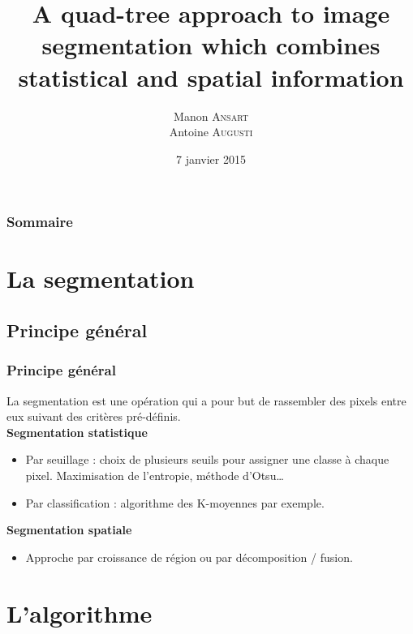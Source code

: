 \documentclass[handout]{beamer}
\title{
	A quad-tree approach to image segmentation which combines statistical and spatial information
}
\author{
	Manon \textsc{Ansart} \\
	\vspace{5px}
	Antoine \textsc{Augusti}
}
\date{7 janvier 2015}
\begin{document}
	\begin{frame}[plain]
		\titlepage
	\end{frame}

	\begin{frame}[plain]
		\frametitle{Sommaire}
		\tableofcontents
	\end{frame}


	\section{La segmentation}

		\subsection{Principe général}
		\begin{frame}
			\frametitle{Principe général}

			La segmentation est une opération qui a pour but de rassembler des pixels entre eux suivant des critères pré-définis.\\
			\vspace{10px}
			\textbf{Segmentation statistique}
			\begin{itemize}
				\item Par seuillage : choix de plusieurs seuils pour assigner une classe à chaque pixel. Maximisation de l'entropie, méthode d'Otsu\dots
				\item Par classification : algorithme des K-moyennes par exemple.
			\end{itemize}

			\vspace{10px}
			\textbf{Segmentation spatiale}
			\begin{itemize}
				\item Approche par croissance de région ou par décomposition / fusion.
			\end{itemize}

		\end{frame}

	\section{L'algorithme}

\end{document}
